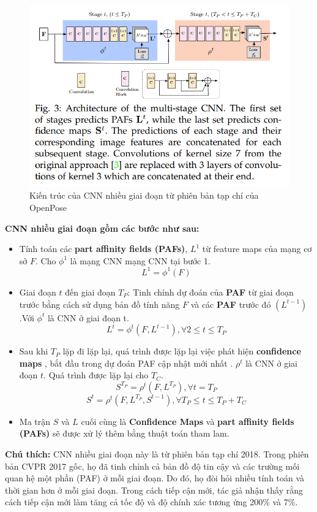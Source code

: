\begin{itemize}
\FloatBarrier
\begin{figure}[htp]
\begin{center}
\includegraphics[scale=0.65]{chap3/c3_figs/CNN_m.png}
\end{center}
\caption{Kiến trúc của CNN nhiều giai đoạn từ phiên bản tạp chí của OpenPose}
\label{fig:CNN_multi_stage}
\end{figure}
\FloatBarrier

\textbf{CNN nhiều giai đoạn gồm các bước như sau:}
\begin{itemize}
\item Tính toán các \textbf{part affinity fields (PAFs)}, $ L^{1}$ từ feature maps của mạng cơ sở $F$. Cho $\phi^1$ là mạng CNN mạng CNN tại bước 1. 
$$L^1 = \phi^1(F) $$

\item Giai đoạn $t$ đến giai đoạn $T_P$: Tinh chỉnh dự đoán của \textbf{PAF} từ giai đoạn trước bằng cách sử dụng bản đồ tính năng $F$ và các \textbf{PAF} trước đó $(L^{t-1})$.Với $\phi^t$ là CNN ở giai đoạn t.
$$L^t = \phi^t(F, L^{t-1}), \forall 2 \leq t \leq T_P$$
\item Sau khi $T_P$ lặp đi lặp lại, quá trình được lặp lại việc phát hiện \textbf{confidence maps} , bắt đầu trong dự đoán PAF cập nhật mới nhất . $\rho^t$ là CNN ở giai đoạn $t$. Quá trình được lặp lại cho $T_C$.
$$S^{T_P} = \rho^t(F, L^{T_P}), \forall t = T_P$$
$$S^t = \rho^t(F, L^{T_P}, S^{t-1}), \forall T_P \leq t \leq T_P + T_C$$

\item Ma trận $S$ và $L$ cuối cùng là \textbf{Confidence Maps} và \textbf{part affinity fields (PAFs)} sẽ được xử lý thêm bằng thuật toán tham lam.

\end{itemize}
\end{itemize}
\textbf{Chú thích:}
CNN nhiều giai đoạn này là từ phiên bản tạp chí 2018. Trong phiên bản CVPR 2017 gốc, họ đã tinh chỉnh cả bản đồ độ tin cậy và các trường mối quan hệ một phần (PAF) ở mỗi giai đoạn. Do đó, họ đòi hỏi nhiều tính toán và thời gian hơn ở mỗi giai đoạn. Trong cách tiếp cận mới, tác giả nhận thấy rằng cách tiếp cận mới làm tăng cả tốc độ và độ chính xác tương ứng 200\% và 7\%.

